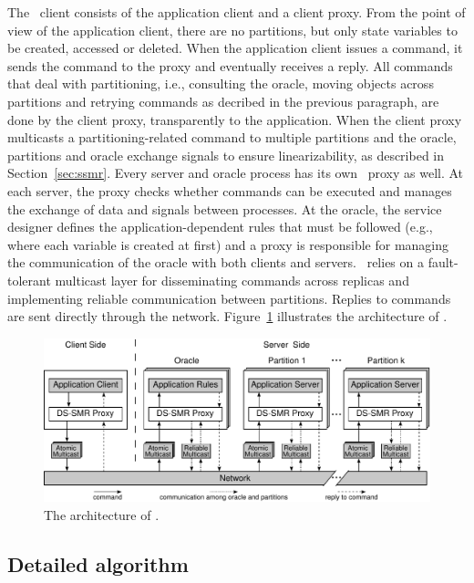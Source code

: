 The \dssmr\ client consists of the application client and a client proxy.
From the point of view of the application client, there are no partitions, but only state variables to be created, accessed or deleted.
When the application client issues a command, it sends the command to the proxy and eventually receives a reply.
All commands that deal with partitioning, i.e., consulting the oracle, moving objects across partitions and retrying commands as decribed in the previous paragraph, are done by the client proxy, transparently to the application.
When the client proxy multicasts a partitioning-related command to multiple partitions and the oracle, partitions and oracle exchange signals to ensure linearizability, as described in Section~\ref{sec:ssmr}.
Every server and oracle process has its own \dssmr\ proxy as well.
At each server, the proxy checks whether commands can be executed and manages the exchange of data and signals between processes.
At the oracle, the service designer defines the application-dependent rules that must be followed (e.g., where each variable is created at first) and a proxy is responsible for managing the communication of the oracle with both clients and servers.
\dssmr\ relies on a fault-tolerant multicast layer for disseminating commands across replicas and implementing reliable communication between partitions.
Replies to commands are sent directly through the network.
Figure~\ref{fig:arch} illustrates the architecture of \dssmr{}.

\begin{figure}
\begin{minipage}[b]{1.0\linewidth} %
\centering
      \includegraphics[width=0.65\linewidth]{figures/arch}
\end{minipage}
\caption{The architecture of \dssmrlong{}.}
\label{fig:arch}
\end{figure}

\subsection{Detailed algorithm}
\label{sec:algorithm}

